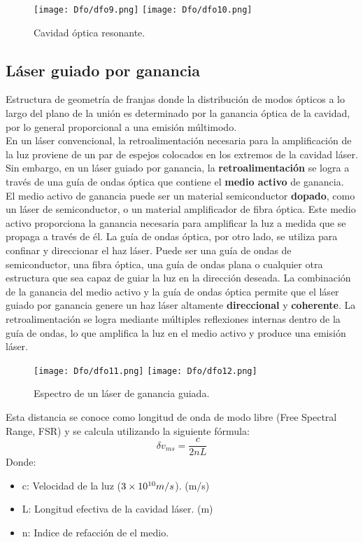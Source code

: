 \documentclass[
	12pt, %
	fleqn, %
	a4paper, %
	oneside, %
]{LegrandOrangeBook}
\begin{document}
\begin{figure}[H]
\centering
\texttt{[image: Dfo/dfo9.png]}
\texttt{[image: Dfo/dfo10.png]}
\caption{Cavidad óptica resonante.}
\end{figure}
\subsection{Láser guiado por ganancia}
Estructura de geometría de franjas donde la distribución de modos ópticos a lo  largo del plano de la unión es determinado por la ganancia óptica de la cavidad, por lo general proporcional a una emisión múltimodo.\\
En un láser convencional, la retroalimentación necesaria para la amplificación de la luz proviene de un par de espejos colocados en los extremos de la cavidad láser. Sin embargo, en un láser guiado por ganancia, la \textbf{retroalimentación} se logra a través de una guía de ondas óptica que contiene el \textbf{medio activo} de ganancia.\\
El medio activo de ganancia puede ser un material semiconductor \textbf{dopado}, como un láser de semiconductor, o un material amplificador de fibra óptica. Este medio activo proporciona la ganancia necesaria para amplificar la luz a medida que se propaga a través de él. La guía de ondas óptica, por otro lado, se utiliza para confinar y direccionar el haz láser. Puede ser una guía de ondas de semiconductor, una fibra óptica, una guía de ondas plana o cualquier otra estructura que sea capaz de guiar la luz en la dirección deseada. La combinación de la ganancia del medio activo y la guía de ondas óptica permite que el láser guiado por ganancia genere un haz láser altamente \textbf{direccional} y \textbf{coherente}. La retroalimentación se logra mediante múltiples reflexiones internas dentro de la guía de ondas, lo que amplifica la luz en el medio activo y produce una emisión láser.
\begin{figure}[H]
\centering
\texttt{[image: Dfo/dfo11.png]}
\texttt{[image: Dfo/dfo12.png]}
\caption{Espectro de un láser de ganancia guiada.}
\end{figure}
\begin{definition}
Esta distancia se conoce como longitud de onda de modo libre (Free Spectral Range, FSR) y se calcula utilizando la siguiente fórmula:
\begin{equation}
\delta v_{ms}=\frac{c}{2nL}
\end{equation}
Donde:
\begin{itemize}
\item c: Velocidad de la luz ($3\times 10^{10} m/s$). (m/s)
\item L: Longitud efectiva de la cavidad láser. (m)
\item n: Indice de refacción de el medio.
\end{itemize}
\end{definition}
\end{document}
